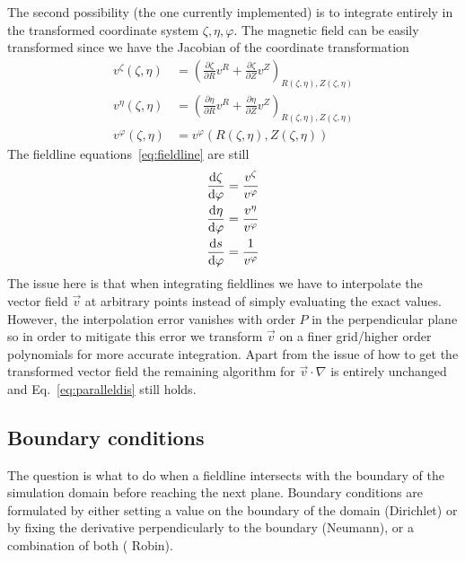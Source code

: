 The second possibility (the one currently implemented)
is to integrate entirely in the
transformed coordinate system $\zeta, \eta, \varphi$.
The magnetic field can be easily transformed since we have the
Jacobian of the coordinate transformation
\begin{align}
    v^\zeta(\zeta, \eta) &= \left(\frac{\partial \zeta}{\partial R} v^{R} + \frac{\partial \zeta}{\partial Z}v^Z\right)_{R(\zeta, \eta), Z(\zeta, \eta)} \\
    v^\eta(\zeta, \eta) &= \left(\frac{\partial \eta}{\partial R} v^{R} + \frac{\partial \eta}{\partial Z}v^Z\right)_{R(\zeta, \eta), Z(\zeta, \eta)} \\
    v^\varphi(\zeta, \eta) &= v^\varphi({R(\zeta, \eta), Z(\zeta, \eta)})
    \label{eq:field_trafo}
\end{align}
The fieldline equations~\eqref{eq:fieldline} are still
\begin{subequations}
\begin{align}
\frac{\mathrm{d} \zeta}{\mathrm{d}\varphi} &= \frac{v^\zeta}{v^\varphi}\\
\frac{\mathrm{d} \eta}{\mathrm{d}\varphi} &= \frac{v^\eta}{v^\varphi}\\
\frac{\mathrm{d} s}{\mathrm{d} \varphi} &= \frac{1}{v^\varphi}
\end{align}
\label{eq:fieldlines_coords}
\end{subequations}
The issue here is that when integrating fieldlines we
have to interpolate the vector field $\vec v$ at arbitrary points
instead of simply evaluating the exact values.
However, the interpolation error vanishes with order $P$ in the
perpendicular plane so in order to mitigate this error
we transform $\vec v$ on a finer grid/higher order polynomials for more accurate
integration.
Apart from the issue of how to get the transformed vector field
the remaining algorithm for $\vec v\cdot\nabla$ is entirely unchanged
and Eq.~\eqref{eq:paralleldis} still holds.

\subsection{Boundary conditions} \label{sec:boundary}
The question is what to do when a fieldline intersects with the boundary
of the simulation domain before reaching the next plane.
Boundary conditions are formulated by either setting a value
on the boundary of the domain (Dirichlet) or by fixing
the derivative perpendicularly to the boundary (Neumann), or
a combination of both ( Robin).


